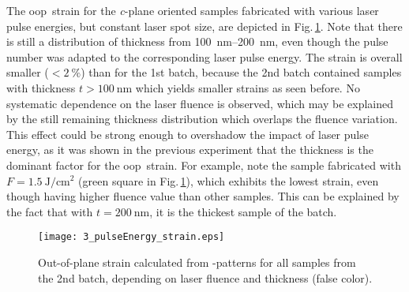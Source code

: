 The \gls{oop}\ strain for the \textit{c}-plane oriented samples fabricated with various laser pulse energies, but constant laser spot size, are depicted in Fig.\,\ref{Fig:Results_3_pulseStrain}.
Note that there is still a distribution of thickness from \qtyrange{100}{200}{\nm}, even though the pulse number was adapted to the corresponding laser pulse energy.
The strain is overall smaller ($<\qty{2}{\percent}$) than for the 1st batch, because the 2nd batch contained samples with thickness $t>\qty{100}{\nm}$ which yields smaller strains as seen before.
No systematic dependence on the laser fluence is observed, which may be explained by the still remaining thickness distribution which overlaps the fluence variation.
This effect could be strong enough to overshadow the impact of laser pulse energy, as it was shown in the previous experiment that the thickness is the dominant factor for the \gls{oop}\ strain.
For example, note the sample fabricated with $F=\qty{1.5}{\J\per\cm\squared}$ (green square in Fig.\,\ref{Fig:Results_3_pulseStrain}), which exhibits the lowest strain, even though having higher fluence value than other samples.
This can be explained by the fact that with $t=\qty{200}{\nm}$, it is the thickest sample of the batch.
\begin{figure}
    \centering
    \texttt{[image: 3\_pulseEnergy\_strain.eps]}
    \caption{
        Out-of-plane strain calculated from \thetaomega-patterns for all samples from the 2nd batch, depending on laser fluence and thickness (false color).
    }
    \label{Fig:Results_3_pulseStrain}
\end{figure}

